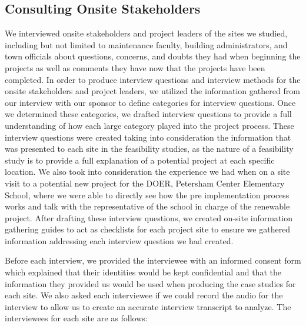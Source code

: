     \subsection{Consulting Onsite Stakeholders}
    \par We interviewed onsite stakeholders and project leaders of the sites we studied, including but not limited to maintenance faculty, building administrators, and town officials about questions, concerns, and doubts they had when beginning the projects as well as comments they have now that the projects have been completed. In order to produce interview questions and interview methods for the onsite stakeholders and project leaders, we utilized the information gathered from our interview with our sponsor to define categories for interview questions. Once we determined these categories, we drafted interview questions to provide a full understanding of how each large category played into the project process. These interview questions were created taking into consideration the information that was presented to each site in the feasibility studies, as the nature of a feasibility study is to provide a full explanation of a potential project at each specific location. We also took into consideration the experience we had when on a site visit to a potential new project for the DOER, Petersham Center Elementary School, where we were able to directly see how the pre implementation process works and talk with the representative of the school in charge of the renewable project. After drafting these interview questions, we created on-site information gathering guides to act as checklists for each project site to ensure we gathered information addressing each interview question we had created.
    \par Before each interview, we provided the interviewee with an informed consent form which explained that their identities would be kept confidential and that the information they provided us would be used when producing the case studies for each site. We also asked each interviewee if we could record the audio for the interview to allow us to create an accurate interview transcript to analyze. The interviewees for each site are as follows:
